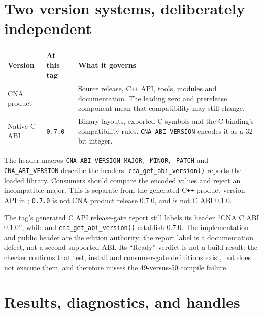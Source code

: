 \section{Two version systems, deliberately independent}

\begin{center}
\small
\begin{tabularx}{\textwidth}{>{\raggedright\arraybackslash}p{3.2cm}p{3.4cm}X}
\toprule
\textbf{Version} & \textbf{At this tag} & \textbf{What it governs} \\
\midrule
CNA product & \CnaProductVersion{} & Source release, C\texttt{++} API, tools, modules and
  documentation. The leading zero and prerelease component mean that compatibility may still
  change. \\
Native C ABI & \texttt{0.7.0} & Binary layouts, exported C symbols and the C binding's
  compatibility rules. \texttt{CNA\_ABI\_VERSION} encodes it as a 32-bit integer. \\
\bottomrule
\end{tabularx}
\end{center}

The header macros \texttt{CNA\_ABI\_VERSION\_MAJOR}, \texttt{\_MINOR}, \texttt{\_PATCH} and
\texttt{CNA\_ABI\_VERSION} describe the headers. \texttt{cna\_get\_abi\_version()} reports the
loaded library. Consumers should compare the encoded values and reject an incompatible major.
This is separate from the generated C\texttt{++} product-version API in
; \texttt{0.7.0} is not CNA product release 0.7.0, and
\CnaProductVersion{} is not C ABI 0.1.0.

\begin{limitationnote}
The tag's generated C API release-gate report still labels its header ``CNA C ABI 0.1.0'', while
 and \texttt{cna\_get\_abi\_version()} establish 0.7.0. The implementation and
public header are the edition authority; the report label is a documentation defect, not a second
supported ABI. Its ``Ready'' verdict is not a build result: the checker confirms that test,
install and consumer-gate definitions exist, but does not execute them, and therefore misses the
49-versus-50 compile failure.
\end{limitationnote}

\section{Results, diagnostics, and handles}

